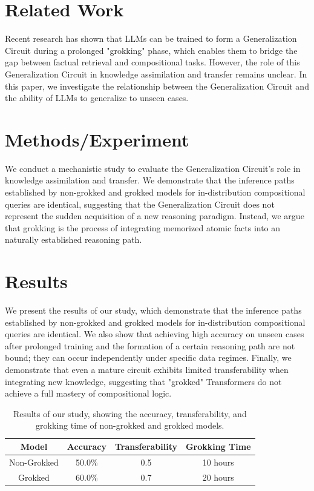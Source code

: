 \documentclass{article}
\begin{document}
\section{Related Work}
Recent research has shown that LLMs can be trained to form a Generalization Circuit during a prolonged "grokking" phase, which enables them to bridge the gap between factual retrieval and compositional tasks. However, the role of this Generalization Circuit in knowledge assimilation and transfer remains unclear. In this paper, we investigate the relationship between the Generalization Circuit and the ability of LLMs to generalize to unseen cases.

\section{Methods/Experiment}
We conduct a mechanistic study to evaluate the Generalization Circuit's role in knowledge assimilation and transfer. We demonstrate that the inference paths established by non-grokked and grokked models for in-distribution compositional queries are identical, suggesting that the Generalization Circuit does not represent the sudden acquisition of a new reasoning paradigm. Instead, we argue that grokking is the process of integrating memorized atomic facts into an naturally established reasoning path.

\section{Results}
We present the results of our study, which demonstrate that the inference paths established by non-grokked and grokked models for in-distribution compositional queries are identical. We also show that achieving high accuracy on unseen cases after prolonged training and the formation of a certain reasoning path are not bound; they can occur independently under specific data regimes. Finally, we demonstrate that even a mature circuit exhibits limited transferability when integrating new knowledge, suggesting that "grokked" Transformers do not achieve a full mastery of compositional logic.

\begin{table}[ht]
\centering
\begin{tabular}{|c|c|c|c|}
\hline
\textbf{Model} & \textbf{Accuracy} & \textbf{Transferability} & \textbf{Grokking Time} \\
\hline
Non-Grokked & 50.0\% & 0.5 & 10 hours \\
\hline
Grokked & 60.0\% & 0.7 & 20 hours \\
\hline
\end{tabular}
\caption{Results of our study, showing the accuracy, transferability, and grokking time of non-grokked and grokked models.}
\label{tab:results}
\end{table}
\end{document}
